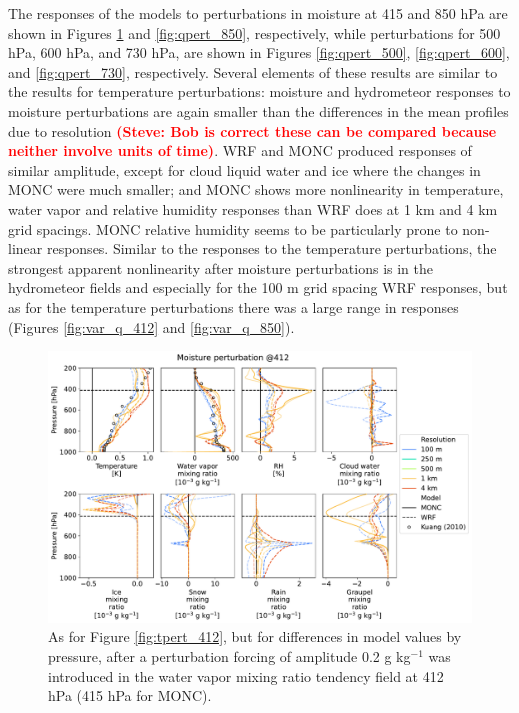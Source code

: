 \documentclass[draft]{agujournal2019}
\newcommand{\todo}[1]{\textcolor{red}{\textbf{(#1)}}}
\begin{document}
The responses of the models to perturbations in moisture at 415 and 850 hPa
are shown in Figures \ref{fig:qpert_412} and \ref{fig:qpert_850}, respectively,
while perturbations for 500 hPa, 600 hPa, and 730 hPa, are shown in Figures
\ref{fig:qpert_500}, \ref{fig:qpert_600}, and \ref{fig:qpert_730}, respectively.
Several elements of these results are similar to the results for temperature
perturbations: moisture and hydrometeor responses to moisture perturbations are
again smaller than the differences in the mean profiles due to resolution
\todo{Steve: Bob is correct these can be compared because neither involve units
of time}. WRF and MONC produced responses of similar amplitude, except for cloud
liquid water and ice where the changes in MONC were much smaller; and MONC shows
more nonlinearity in temperature, water vapor and relative humidity responses
than WRF does at 1 km and 4 km grid spacings. MONC relative humidity seems to be
particularly prone to non-linear responses. Similar to the responses to the
temperature perturbations, the strongest apparent nonlinearity after moisture
perturbations is in the hydrometeor fields and especially for the 100 m grid
spacing WRF responses, but as for the temperature perturbations there was a
large range in responses (Figures \ref{fig:var_q_412} and \ref{fig:var_q_850}).

\begin{figure}[pth]
    \noindent\includegraphics[width=\textwidth]{figures/pert_diffs_q_0.0002_@412}
    \caption{As for Figure \ref{fig:tpert_412}, but for differences in model
    values by pressure, after a perturbation forcing of amplitude 0.2 g
    kg$^{-1}$ was introduced in the water vapor mixing ratio tendency field at
    412 hPa (415 hPa for MONC).}
    \label{fig:qpert_412}
\end{figure}
\end{document}

